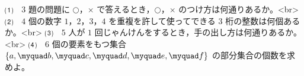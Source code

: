 ⑴　$3$ 題の問題に $\bigcirc$，$\times$ で答えるとき，$\bigcirc$，$\times$ のつけ方は何通りあるか。<br>
⑵　$4$ 個の数字 $1$，$2$，$3$，$4$ を重複を許して使ってできる $3$ 桁の整数は何個あるか。<br>
⑶　$5$ 人が $1$ 回じゃんけんをするとき，手の出し方は何通りあるか。<br>
⑷　$6$ 個の要素をもつ集合 $\{a,\myquad b,\myquad c,\myquad d,\myquad e,\myquad f\}$ の部分集合の個数を求めよ。
